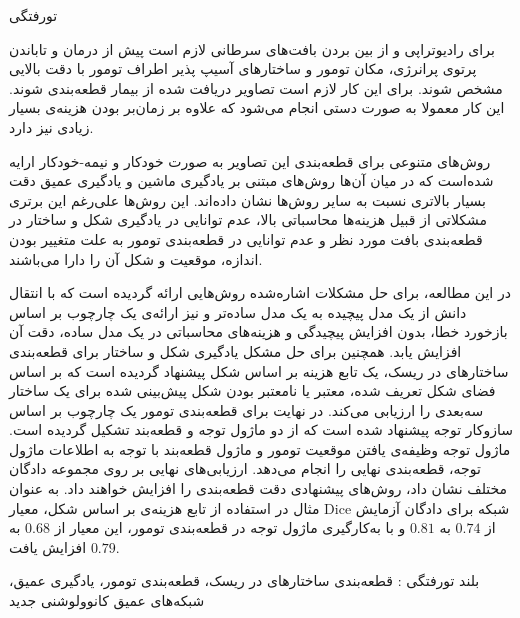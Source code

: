 


\pagestyle{empty}

‌تورفتگی

برای رادیوتراپی و از بین بردن بافت‌های سرطانی لازم است پیش از درمان و تاباندن پرتوی پرانرژی، مکان تومور و ساختارهای آسیپ پذیر اطراف تومور با دقت بالایی مشخص شوند. برای این کار لازم است تصاویر دریافت شده از بیمار قطعه‌بندی شوند. این کار معمولا به صورت دستی انجام می‌شود که علاوه بر زمان‌بر بودن هزینه‌ی بسیار زیادی نیز دارد. 

روش‌های متنوعی برای قطعه‌بندی این تصاویر به صورت خودکار و نیمه-خودکار ارایه شده‌است که در میان آن‌ها روش‌های مبتنی بر یادگیری ماشین و یادگیری عمیق دقت بسیار بالاتری نسبت به سایر روش‌ها نشان داده‌اند. این روش‌ها علی‌رغم این برتری مشکلاتی از قبیل هزینه‌ها محاسباتی بالا، عدم توانایی در یادگیری شکل و ساختار در قطعه‌بندی بافت مورد نظر و عدم توانایی در قطعه‌بندی تومور به علت متغییر بودن اندازه، موقعیت و شکل آن را دارا می‌باشند. 

در این مطالعه، برای حل مشکلات اشاره‌شده روش‌هایی ارائه گردیده است که با انتقال دانش از یک مدل پیچیده به یک مدل ساده‌تر و نیز ارائه‌ی یک چارچوب بر اساس بازخورد خطا، بدون افزایش پیچیدگی و هزینه‌های محاسباتی در یک مدل ساده، دقت آن افزایش یابد. همچنین برای حل مشکل یادگیری شکل و ساختار برای قطعه‌بندی ساختارهای در ریسک، یک تابع هزینه بر اساس شکل پیشنهاد گردیده است که بر اساس فضای شکل تعریف شده، معتبر یا نامعتبر بودن شکل پیش‌بینی شده برای یک ساختار سه‌بعدی را ارزیابی می‌کند. در نهایت برای قطعه‌بندی تومور یک چارچوب بر اساس سازوکار توجه پیشنهاد شده است که از دو ماژول توجه و قطعه‌بند تشکیل گردیده است. ماژول توجه وظیفه‌ی یافتن موقعیت تومور و ماژول قطعه‌بند با توجه به اطلاعات ماژول توجه، قطعه‌بندی نهایی را انجام می‌دهد. ارزیابی‌های نهایی بر روی مجموعه دادگان مختلف نشان داد، روش‌های پیشنهادی دقت قطعه‌بندی را افزایش خواهند داد. به عنوان مثال در استفاده از تابع هزینه‌ی بر اساس شکل، معیار Dice شبکه برای دادگان آزمایش از $0.74$ به $0.81$ و با به‌کارگیری ماژول توجه در قطعه‌بندی تومور، این معیار از $0.68$ به $0.79$ افزایش یافت.


‌بلند
‌تورفتگی : 
قطعه‌بندی ساختار‌های در ریسک، قطعه‌بندی تومور، یادگیری عمیق، شبکه‌های عمیق کانوولوشنی
‌جدید
